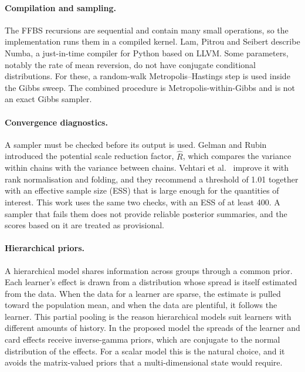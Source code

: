 \paragraph{Compilation and sampling.}
The FFBS recursions are sequential and contain many small operations, so the implementation runs them in
a compiled kernel. Lam, Pitrou and Seibert \cite{lam2015numba} describe Numba, a just-in-time compiler
for Python based on LLVM. Some parameters, notably the rate of mean reversion, do not have conjugate
conditional distributions. For these, a random-walk Metropolis--Hastings step is used inside the Gibbs
sweep. The combined procedure is Metropolis-within-Gibbs and is not an exact Gibbs sampler.

\paragraph{Convergence diagnostics.}
A sampler must be checked before its output is used. Gelman and Rubin \cite{gelman1992inference} introduced
the potential scale reduction factor, $\hat{R}$, which compares the variance within chains with the
variance between chains. Vehtari et al.\ \cite{vehtari2021rank} improve it with rank normalisation and
folding, and they recommend a threshold of 1.01 together with an effective sample size (ESS) that is large
enough for the quantities of interest. This work uses the same two checks, with an ESS of at least 400. A
sampler that fails them does not provide reliable posterior summaries, and the scores based on it are
treated as provisional.

\paragraph{Hierarchical priors.}
A hierarchical model shares information across groups through a common prior. Each learner's effect is drawn
from a distribution whose spread is itself estimated from the data. When the data for a learner are sparse, the
estimate is pulled toward the population mean, and when the data are plentiful, it follows the learner. This
partial pooling is the reason hierarchical models suit learners with different amounts of history. In the
proposed model the spreads of the learner and card effects receive inverse-gamma priors, which are conjugate
to the normal distribution of the effects. For a scalar model this is the natural choice, and it avoids the
matrix-valued priors that a multi-dimensional state would require.

